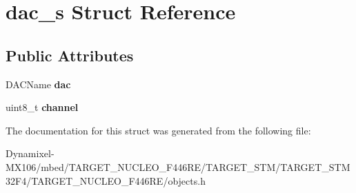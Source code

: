 \hypertarget{structdac__s}{}\section{dac\+\_\+s Struct Reference}
\label{structdac__s}
\subsection*{Public Attributes}
\begin{DoxyCompactItemize}
\item 
D\+A\+C\+Name {\bfseries dac}\hypertarget{structdac__s_ac8d8a807ff7a23cfe3c9ea62c7b587c6}{}\label{structdac__s_ac8d8a807ff7a23cfe3c9ea62c7b587c6}

\item 
uint8\+\_\+t {\bfseries channel}\hypertarget{structdac__s_ada4023cef82749a64fcd8eb47a7e8cd0}{}\label{structdac__s_ada4023cef82749a64fcd8eb47a7e8cd0}

\end{DoxyCompactItemize}


The documentation for this struct was generated from the following file\+:\begin{DoxyCompactItemize}
\item 
Dynamixel-\/\+M\+X106/mbed/\+T\+A\+R\+G\+E\+T\+\_\+\+N\+U\+C\+L\+E\+O\+\_\+\+F446\+R\+E/\+T\+A\+R\+G\+E\+T\+\_\+\+S\+T\+M/\+T\+A\+R\+G\+E\+T\+\_\+\+S\+T\+M32\+F4/\+T\+A\+R\+G\+E\+T\+\_\+\+N\+U\+C\+L\+E\+O\+\_\+\+F446\+R\+E/objects.\+h\end{DoxyCompactItemize}
